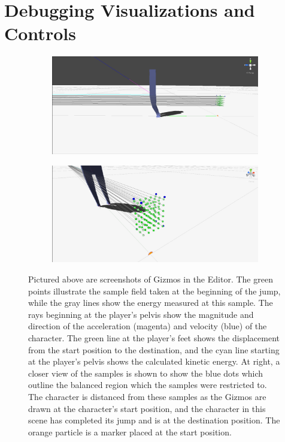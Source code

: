 \section{Debugging Visualizations and Controls}
\label{section:debug_control_vis}

\begin{figure}[ht]
	\centering
	\begin{subfigure}[b]{0.49\textwidth}
		\includegraphics[width=\textwidth]{images/gizmos1.png}
	\end{subfigure}
	\begin{subfigure}[b]{0.49\textwidth}
		\includegraphics[width=\textwidth]{images/gizmos2.png}
	\end{subfigure}
	\caption[Screenshot of Gizmos used for debug visualizations in \unity{}]{Pictured above are screenshots of Gizmos in the \unity{} Editor.  The green points illustrate the sample field taken at the beginning of the jump, while the gray lines show the energy measured at this sample.  The rays beginning at the player's pelvis show the magnitude and direction of the acceleration (magenta) and velocity (blue) of the character.  The green line at the player's feet shows the displacement from the start position to the destination, and the cyan line starting at the player's pelvis shows the calculated kinetic energy.  At right, a closer view of the samples is shown to show the blue dots which outline the balanced region which the samples were restricted to.  The character is distanced from these samples as the Gizmos are drawn at the character's start position, and the character in this scene has completed its jump and is at the destination position.  The orange particle is a marker placed at the start position.}
	\label{fig:gizmo_vis}
\end{figure}

